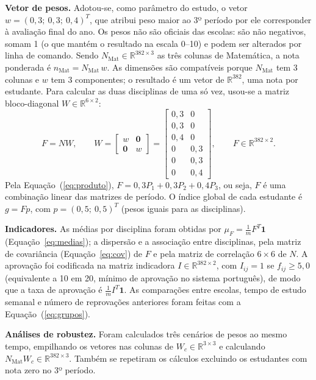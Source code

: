 \documentclass[12pt,a4paper]{article}
\newcommand{\R}{\mathbb{R}}
\begin{document}
\textbf{Vetor de pesos.} Adotou-se, como parâmetro do estudo, o vetor $w=(0{,}3;\ 0{,}3;\ 0{,}4)^T$, que atribui peso maior ao 3º período por ele corresponder à avaliação final do ano. Os pesos não são oficiais das escolas: são não negativos, somam 1 (o que mantém o resultado na escala 0--10) e podem ser alterados por linha de comando. Sendo $N_{\text{Mat}}\in\R^{382\times 3}$ as três colunas de Matemática, a nota ponderada é $n_{\text{Mat}}=N_{\text{Mat}}\,w$. As dimensões são compatíveis porque $N_{\text{Mat}}$ tem 3 colunas e $w$ tem 3 componentes; o resultado é um vetor de $\R^{382}$, uma nota por estudante. Para calcular as duas disciplinas de uma só vez, usou-se a matriz bloco-diagonal $W\in\R^{6\times 2}$:
\begin{equation}
F=NW,\qquad
W=\begin{bmatrix} w & \mathbf{0}\\ \mathbf{0} & w\end{bmatrix}=
\begin{bmatrix}
0{,}3 & 0\\ 0{,}3 & 0\\ 0{,}4 & 0\\ 0 & 0{,}3\\ 0 & 0{,}3\\ 0 & 0{,}4
\end{bmatrix},
\qquad F\in\R^{382\times 2}.
\label{eq:F}
\end{equation}
Pela Equação~(\ref{eq:produto}), $F=0{,}3P_1+0{,}3P_2+0{,}4P_3$, ou seja, $F$ é uma combinação linear das matrizes de período. O índice global de cada estudante é $g=Fp$, com $p=(0{,}5;\ 0{,}5)^T$ (pesos iguais para as disciplinas).

\textbf{Indicadores.} As médias por disciplina foram obtidas por $\mu_F=\frac{1}{m}F^T\mathbf{1}$ (Equação~\ref{eq:medias}); a dispersão e a associação entre disciplinas, pela matriz de covariância (Equação~\ref{eq:cov}) de $F$ e pela matriz de correlação $6\times 6$ de $N$. A aprovação foi codificada na matriz indicadora $I\in\R^{382\times 2}$, com $I_{ij}=1$ se $f_{ij}\ge 5{,}0$ (equivalente a 10 em 20, mínimo de aprovação no sistema português), de modo que a taxa de aprovação é $\frac{1}{m}I^T\mathbf{1}$. As comparações entre escolas, tempo de estudo semanal e número de reprovações anteriores foram feitas com a Equação~(\ref{eq:grupos}).

\textbf{Análises de robustez.} Foram calculados três cenários de pesos ao mesmo tempo, empilhando os vetores nas colunas de $W_c\in\R^{3\times 3}$ e calculando $N_{\text{Mat}}W_c\in\R^{382\times 3}$. Também se repetiram os cálculos excluindo os estudantes com nota zero no 3º período.
\end{document}
